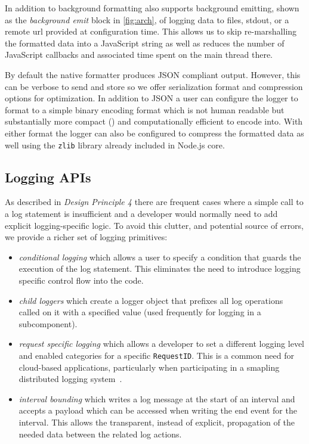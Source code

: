 In addition to background formatting \projn also supports background emitting, 
shown as the \emph{background emit} block in \autoref{fig:arch}, of 
logging data to files, stdout, or a remote url provided at configuration time. This 
allows us to skip re-marshalling the formatted data into a JavaScript string as well 
as reduces the number of JavaScript callbacks and associated time spent on the 
main thread there. 

By default the native formatter produces JSON compliant output. However, this 
can be verbose to send and store so we offer serialization format and compression 
options for optimization. In addition to JSON a user can configure the logger 
to format to a simple binary encoding format which is not human readable but 
substantially more compact () and computationally efficient to 
encode into. With either format the logger can also be configured to compress the 
formatted data as well using the \texttt{zlib} library already included in 
Node.js core.

\subsection{Logging APIs}
As described in \emph{Design Principle 4} there are frequent cases where a 
simple call to a log statement is insufficient and a developer would normally 
need to add explicit logging-specific logic. To avoid this clutter, and potential 
source of errors, we provide a richer set of logging primitives:
\begin{itemize}
  \item \emph{conditional logging} which allows a user to specify a condition 
  that guards the execution of the log statement. This eliminates the need to 
  introduce logging specific control flow into the code.
  \item \emph{child loggers} which create a logger object that prefixes all log 
  operations called on it with a specified value (used frequently for logging in a 
  subcomponent).
  \item \emph{request specific logging} which allows a developer to set a different 
  logging level and enabled categories for a specific \texttt{RequestID}. This is a 
  common need for cloud-based applications, particularly when participating in a 
  smapling distributed logging system~\cite{distlogger}.
  \item \emph{interval bounding} which writes a log message at the start of an interval 
  and accepts a payload which can be accessed when writing the end event for the interval. 
  This allows the transparent, instead of explicit, propagation of the needed data between 
  the related log actions.
\end{itemize}

